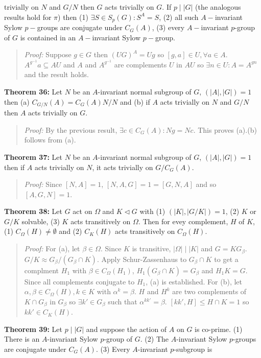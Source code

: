 trivially on $N$ and $G/N$ then $G$ acts trivially on $G$. If $p \mid |G|$ (the analogous
results hold for $\pi$) then (1) $\exists S \in S_p(G): S^A=S$, (2) all such $A-$invariant
Sylow $p-$groups are conjugate under $C_G(A)$, (3) every $A-$invariant $p$-group of
$G$ is contained in an $A-$invariant Sylow $p-$group. \begin{quote}
\emph{Proof:}  Suppose $g \in G$ then $(UG)^A = Ug$ so $[g,a] \in U, \forall a \in A$.
$A^{g^{-1}}a \subseteq AU$ and $A$ and $A^{g^{-1}}$ are complements $U$ in $AU$
so $\exists n \in U: A= A^{gn}$ and the result holds.
\end{quote}
{\bf Theorem 36:}
Let $N$ be an $A$-invariant normal subgroup of $G$, $(|A|, |G|)=1$ then
(a) $C_{G/N}(A)= C_G(A)N/N$ and  (b) if $A$ acts trivially on $N$ and $G/N$ then
$A$ acts trivially on $G$.
\begin{quote}
\emph{Proof:}  By the previous result, $\exists c \in C_G(A): Ng= Nc$.  This proves (a).(b) follows from (a).
\end{quote}
{\bf Theorem 37:}
Let $N$ be an $A$-invariant normal subgroup of $G$, $(|A|, |G|)=1$ then
if $A$ acts trivially on $N$, it acts trivially on $G/C_G(A)$.
\begin{quote}
\emph{Proof:}  Since $[N,A]=1$, $[N,A,G]= 1= [G,N,A]$ and so $[A,G,N] = 1$.
\end{quote}
{\bf Theorem 38:}
Let $G$ act on $\Omega$ and $K \lhd G$ with (1) $(|K|, |G/K|)=1$, (2) $K$ or $G/K$ solvable,
(3) $K$ acts transitively on $\Omega$.  Then for evey complement, $H$ of $K$, (1) $C_{\Omega}(H) \ne \emptyset$ and
(2) $C_K(H)$ acts transitively on $C_{\Omega}(H)$.
\begin{quote}
\emph{Proof:}  For (a), let $\beta \in \Omega$.  Since $K$ is transitive, $|\Omega| \mid |K|$ and $G= K G_{\beta}$.
$G/K \approx G_{\beta}/(G_{\beta} \cap K)$.  Apply Schur-Zassenhaus to $G_{\beta} \cap K$ to get a complment
$H_1$ with $\beta \in C_{\Omega}(H_1)$, $H_1(G_{\beta} \cap K)= G_{\beta}$ and $H_1K=G$.  Since all complements
conjugate to $H_1$, (a) is established.  For (b), let $\alpha, \beta \in C_{\Omega}(H), k \in K$ with
$\alpha^k= \beta$.  $H$ and $H^k$ are two complements of $K \cap G_{\beta}$ in $G_{\beta}$ so
$\exists k' \in G_{\beta}$ such that $\alpha^{k k'}= \beta$.  $[k k', H] \leq H \cap K =1$ so
$k k' \in C_K(H)$.
\end{quote}
{\bf Theorem 39:}
Let $p \mid |G|$ and suppose the action of $A$ on $G$ is co-prime.  (1) There is an $A$-invariant Sylow $p$-group of
$G$. (2) The $A$-invariant Sylow $p$-groups are conjugate under $C_G(A)$.  (3) Every $A$-invariant $p$-subgroup is
